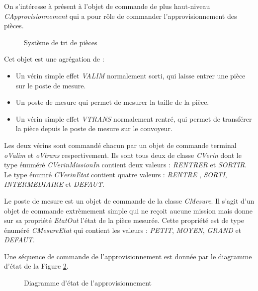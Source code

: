 On s'intéresse à présent à l'objet de commande de plus haut-niveau \textit{CApprovisionnement} qui a pour rôle de commander l'approvisionnement des pièces. 

\begin{figure}
    \centering
    \caption{Système de tri de pièces}
    \label{fig:tri_de_piece}
\end{figure}

Cet objet est une agrégation de : 
\begin{itemize}
    \item Un vérin simple effet \emph{VALIM} normalement sorti, qui laisse entrer une pièce sur le poste de mesure.
    \item Un poste de mesure qui permet de mesurer la taille de la pièce.
    \item Un vérin simple effet \emph{VTRANS} normalement rentré, qui permet de transférer la pièce depuis le poste de mesure sur le convoyeur.
\end{itemize}

Les deux vérins sont commandé chacun par un objet de commande terminal \emph{oValim} et \emph{oVtrans} respectivement. Ils sont tous deux de classe \emph{CVerin} dont le type énuméré \emph{CVerinMissionIn} contient deux valeurs : \emph{RENTRER} et \emph{SORTIR}. Le type énumré \emph{CVerinEtat} contient quatre valeurs : \emph{RENTRE} , \emph{SORTI}, \emph{INTERMEDIAIRE} et \emph{DEFAUT}.

Le poste de mesure est un objet de commande de la classe \emph{CMesure}. Il s'agit d'un objet de commande extrèmement simple qui ne reçoit aucune mission mais donne sur sa propriété \emph{EtatOut} l'état de la pièce mesurée. Cette propriété est de type énuméré \emph{CMesureEtat} qui contient les valeurs : \emph{PETIT}, \emph{MOYEN}, \emph{GRAND} et \emph{DEFAUT}.

Une séquence de commande de l'approvisionnement est donnée par le diagramme d'état de la Figure \ref{fig:approvisionnement}.

\begin{figure}[h!t]
    \centering
    
    \caption{Diagramme d'état de l'approvisionnement}
    \label{fig:approvisionnement}
\end{figure}
